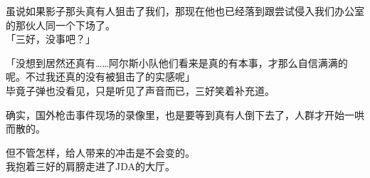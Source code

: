 虽说如果影子那头真有人狙击了我们，那现在他也已经落到跟尝试侵入我们办公室的那伙人同一个下场了。\\

「三好，没事吧？」

「没想到居然还真有……阿尔斯小队他们看来是真的有本事，才那么自信满满的呢。不过我还真的没有被狙击了的实感呢」\\

毕竟子弹也没看见，只是听见了声音而已，三好笑着补充道。

确实，国外枪击事件现场的录像里，也是要等到真有人倒下去了，人群才开始一哄而散的。

但不管怎样，给人带来的冲击是不会变的。\\

我抱着三好的肩膀走进了JDA的大厅。\\
